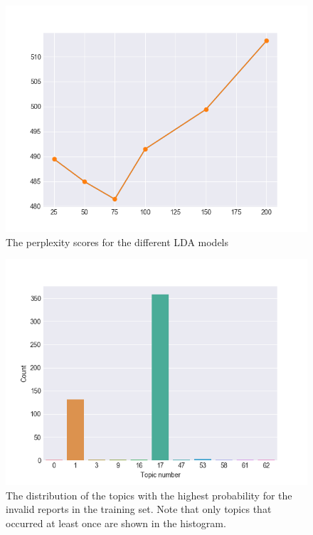 \begin{figure}
    \centering
    \includegraphics[scale=0.9]{figures/lda-perplexity.png}
    \caption{The perplexity scores for the different LDA models}
    \label{fig:lda-perplexity}
\end{figure}

\begin{figure}
    \centering
    \includegraphics[scale=0.9]{figures/invalid_reports_most_likely_topics_histogram.png}
    \caption{The distribution of the topics with the highest probability for the invalid reports in the training set. Note that only topics that occurred at least once are shown in the histogram.}
    \label{fig:invalid-reports-most-likely-topics}
\end{figure}

